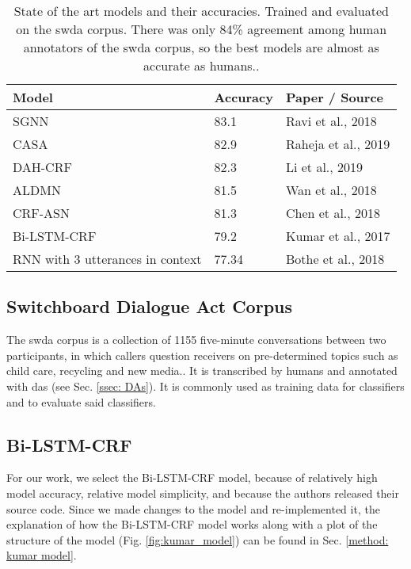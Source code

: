     \begin{table}[ht]
    \centering
    \begin{tabular}{|l|l|l|}
    \hline
    \textbf{Model}                   & \textbf{Accuracy} & \textbf{Paper / Source}      \\ \hline
    SGNN                             & 83.1              & Ravi et al., 2018 \cite{ravi2018self}   \\ \hline
    CASA                             & 82.9              & Raheja et al., 2019\cite{raheja2019dialogue} \\ \hline
    DAH-CRF                          & 82.3              & Li et al., 2019 \cite{li2018dual}     \\ \hline
    ALDMN                            & 81.5              & Wan et al., 2018 \cite{wan2018improved}    \\ \hline
    CRF-ASN                          & 81.3              & Chen et al., 2018 \cite{chen2018dialogue}   \\ \hline
    Bi-LSTM-CRF                      & 79.2              & Kumar et al., 2017 \cite{kumar2017dialogue}  \\ \hline
    RNN with 3 utterances in context & 77.34             & Bothe et al., 2018 \cite{bothe2018context}  \\ \hline
    \end{tabular}
    \caption{State of the art \glspl{model} and their accuracies. Trained and evaluated on the \gls{swda} corpus. There was only 84\% agreement among human annotators of the \gls{swda} corpus, so the best \glspl{model} are almost as accurate as humans.\cite{swda}.}
    \label{table: da models}
    \end{table}

    \subsection{Switchboard Dialogue Act Corpus \label{ssec: swda}}
        The \gls{swda} corpus is a collection of 1155 five-minute conversations between two participants, in which callers question receivers on pre-determined topics such as child care, recycling and new media.\cite{fang2012annotation}. It is transcribed by humans and annotated with \glspl{da} (see Sec. \ref{ssec: DAs}). It is commonly used as training data for classifiers and to evaluate said classifiers.

    \subsection{Bi-LSTM-CRF \label{sssec: kumar model}}
    For our work, we select the Bi-LSTM-CRF \gls{model}\cite{kumar2017dialogue}, because of relatively high \gls{model} accuracy, relative \gls{model} simplicity, and because the authors released their source code. 
    Since we made changes to the \gls{model} and re-implemented it, the explanation of how the Bi-LSTM-CRF \gls{model} works along with a plot of the structure of the \gls{model} (Fig. \ref{fig:kumar_model}) can be found in Sec. \ref{method: kumar model}.
